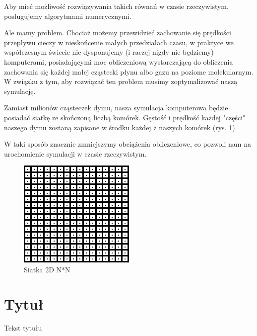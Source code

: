 \documentclass[a4paper,12pt]{article}
\begin{document}
	\vspace{5mm}
	
	Aby mieć możliwość rozwiązywania takich równań w czasie rzeczywistym,
	posługujemy algorytmami numerycznymi.
	
	\vspace{5mm}
	
	Ale mamy problem. Chociaż możemy przewidzieć zachowanie się prędkości
	przepływu cieczy w nieskońcenie małych przedziałach czasu, w praktyce we
	współczesnym świecie nie dysponujemy (i raczej nigdy nie będziemy)
	komputerami, posiadającymi moc obliczeniową wystarczającą do obliczenia
	zachowania się każdej małej cząstecki płynu albo gazu na poziome
	molekularnym. W związku z tym, aby rozwiązać ten problem musimy
	zoptymalizować naszą symulację.
	
	\vspace{5mm}
	
	Zamiast milionów cząsteczek dymu, nasza
	symulacja komputerowa będzie posiadać siatkę ze skończoną liczbą komórek.
	Gęstość i prędkość każdej "części" naszego dymu zostaną zapisane w środku
	każdej z naszych komórek (rys. 1).
	
    \vspace{5mm}
    
    W taki sposób znacznie zmniejszymy obciążenia obliczeniowe,
    co pozwoli nam na urochomienie symulacji w czasie rzeczywistym.
    
    \begin{figure}
    \centerline{\includegraphics[scale=2]{grid2.png}}
    \caption{Siatka 2D N*N}
    \label{fig:siatka2d}
    \end{figure}
	
	
	\section{Tytuł}
	Tekst tytułu
	
\end{document}
